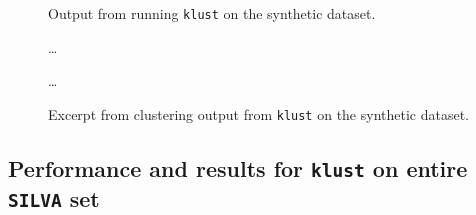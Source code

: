 \begin{figure}[H]
  \centering
  
  \caption{Output from running \texttt{klust} on the synthetic dataset.}
  \label{fig:synth_silva_output}
\end{figure}

\begin{figure}[H]
  \centering
  
  \dots
  
  \dots
  
  \caption{Excerpt from clustering output from \texttt{klust} on the
    synthetic dataset.}
  \label{fig:synth_silva_clustering}
\end{figure}


\subsection{Performance and results for \texttt{klust} on entire \texttt{SILVA} set}
\label{app:performance_results_full_SILVA}


